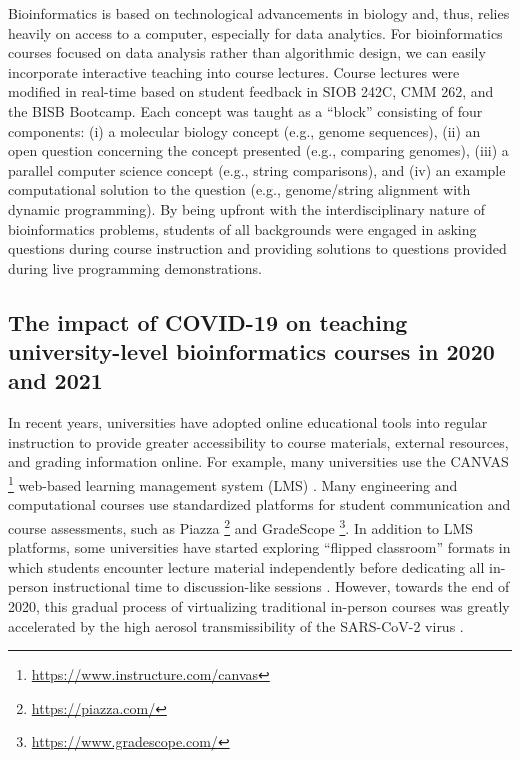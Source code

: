 Bioinformatics is based on technological advancements in biology and, thus, relies heavily on access to a computer, especially for data analytics. For bioinformatics courses focused on data analysis rather than algorithmic design, we can easily incorporate interactive teaching into course lectures. Course lectures were modified in real-time based on student feedback in SIOB 242C, CMM 262, and the BISB Bootcamp. Each concept was taught as a “block” consisting of four components: (i) a molecular biology concept (e.g., genome sequences), (ii) an open question concerning the concept presented (e.g., comparing genomes), (iii) a parallel computer science concept (e.g., string comparisons), and (iv) an example computational solution to the question (e.g., genome/string alignment with dynamic programming). By being upfront with the interdisciplinary nature of bioinformatics problems, students of all backgrounds were engaged in asking questions during course instruction and providing solutions to questions provided during live programming demonstrations. 

\subsection{The impact of COVID-19 on teaching university-level bioinformatics courses in 2020 and 2021}

In recent years, universities have adopted online educational tools into regular instruction to provide greater accessibility to course materials, external resources, and grading information online. For example, many universities use the CANVAS \footnote{\href{https://www.instructure.com/canvas}{https://www.instructure.com/canvas}} web-based learning management system (LMS) \cite{marachi2020,beldarrain2006,endozo2020}. Many engineering and computational courses use standardized platforms for student communication and course assessments, such as Piazza \footnote{\href{https://piazza.com/}{https://piazza.com/}} and GradeScope \footnote{\href{https://www.gradescope.com/}{https://www.gradescope.com/}}. In addition to LMS platforms, some universities have started exploring “flipped classroom” formats in which students encounter lecture material independently before dedicating all in-person instructional time to discussion-like sessions \cite{polat2022,long2017,jared2014}. However, towards the end of 2020, this gradual process of virtualizing traditional in-person courses was greatly accelerated by the high aerosol transmissibility of the SARS-CoV-2 virus \cite{jones2020,holingue2020,wu2020}. 

